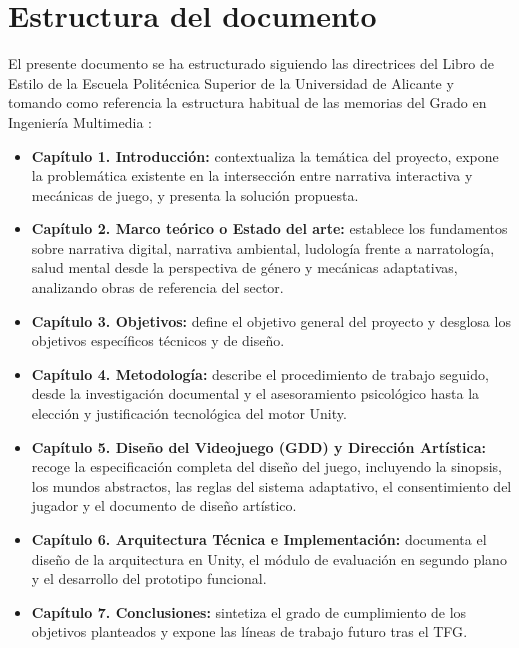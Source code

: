 \section{Estructura del documento}
El presente documento se ha estructurado siguiendo las directrices del Libro de Estilo de la Escuela Politécnica Superior de la Universidad de Alicante \parencite{eps2015} y tomando como referencia la estructura habitual de las memorias del Grado en Ingeniería Multimedia \parencite{finestrat2018}:
\begin{itemize}
    \item \textbf{Capítulo 1. Introducción:} contextualiza la temática del proyecto, expone la problemática existente en la intersección entre narrativa interactiva y mecánicas de juego, y presenta la solución propuesta.
    \item \textbf{Capítulo 2. Marco teórico o Estado del arte:} establece los fundamentos sobre narrativa digital, narrativa ambiental, ludología frente a narratología, salud mental desde la perspectiva de género y mecánicas adaptativas, analizando obras de referencia del sector.
    \item \textbf{Capítulo 3. Objetivos:} define el objetivo general del proyecto y desglosa los objetivos específicos técnicos y de diseño.
    \item \textbf{Capítulo 4. Metodología:} describe el procedimiento de trabajo seguido, desde la investigación documental y el asesoramiento psicológico hasta la elección y justificación tecnológica del motor Unity.
    \item \textbf{Capítulo 5. Diseño del Videojuego (GDD) y Dirección Artística:} recoge la especificación completa del diseño del juego, incluyendo la sinopsis, los mundos abstractos, las reglas del sistema adaptativo, el consentimiento del jugador y el documento de diseño artístico.
    \item \textbf{Capítulo 6. Arquitectura Técnica e Implementación:} documenta el diseño de la arquitectura en Unity, el módulo de evaluación en segundo plano y el desarrollo del prototipo funcional.
    \item \textbf{Capítulo 7. Conclusiones:} sintetiza el grado de cumplimiento de los objetivos planteados y expone las líneas de trabajo futuro tras el \ac{TFG}.
\end{itemize}